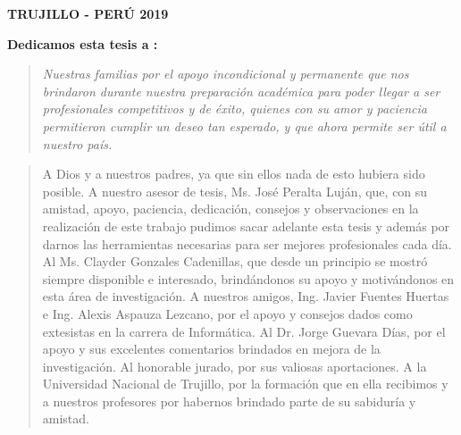 \vskip 1.1cm
\begin{center}    
{\bf {\fontsize{14}{16.8}\selectfont TRUJILLO - PERÚ
\vskip 0.0cm
\hspace*{-0.2cm} 
2019 }}
\end{center} 
\newpage


 \pagestyle{plain}
 {\bf\Large {Dedicamos esta tesis a :}}
 \vskip 1cm
\begin{quotation}
{\it Nuestras familias por el apoyo incondicional y permanente que nos brindaron durante nuestra preparación académica para poder llegar a ser profesionales competitivos y de éxito, quienes con su amor y paciencia permitieron cumplir un deseo tan esperado, y que ahora permite ser útil a nuestro país.}
\end{quotation}


\newpage

 {\bf\Large {}}
\vskip 0.2cm
\begin{quotation}
A Dios y a nuestros padres, ya que sin ellos nada de esto hubiera sido posible.
{\vskip 0.2cm}
A nuestro asesor de tesis, Ms. José Peralta Luján, que, con su amistad, apoyo, paciencia, dedicación, consejos y observaciones en la realización de este trabajo pudimos sacar adelante esta tesis y además por darnos las herramientas necesarias para ser mejores profesionales cada día.
\vskip 0.2cm
Al Ms. Clayder Gonzales Cadenillas, que desde un principio se mostró siempre disponible e interesado, brindándonos su apoyo y motivándonos en esta área de investigación.
\vskip 0.2cm
A nuestros amigos, Ing. Javier Fuentes Huertas e Ing. Alexis Aspauza Lezcano, por el apoyo y consejos dados como extesistas en la carrera de Informática.
\vskip 0.2cm
Al Dr. Jorge Guevara Días, por el apoyo y sus excelentes comentarios brindados en mejora de la investigación.
\vskip 0.2cm
Al honorable jurado, por sus valiosas aportaciones.
\vskip 0.2cm
A la Universidad Nacional de Trujillo, por la formación que en ella recibimos y a nuestros profesores por habernos brindado parte de su sabiduría y amistad.
 \end{quotation}


